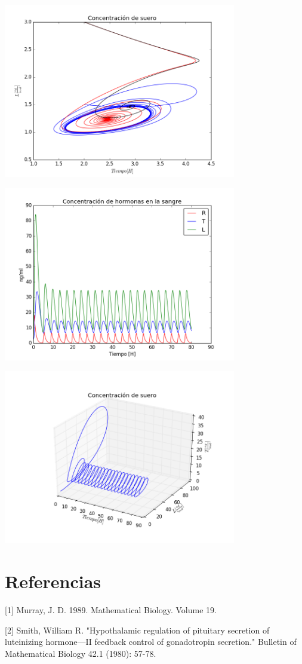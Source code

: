 \documentclass[letter,11pt]{article}
\begin{document}
\begin{center}
 \includegraphics[width=4in]{imagenes/Graficas/g4_2d.png}
\end{center}

\begin{center}
 \includegraphics[width=4in]{imagenes/Graficas/g5_g2-modelo2.png}
\end{center}

\begin{center}
 \includegraphics[width=4in]{imagenes/Graficas/g6_modelo2.png}
\end{center}


\section{Referencias}

[1] Murray, J. D. 1989. Mathematical Biology. Volume 19. 

[2] Smith, William R. "Hypothalamic regulation of pituitary secretion of luteinizing hormone—II feedback control of gonadotropin secretion." Bulletin of Mathematical Biology 42.1 (1980): 57-78.
\end{document}
